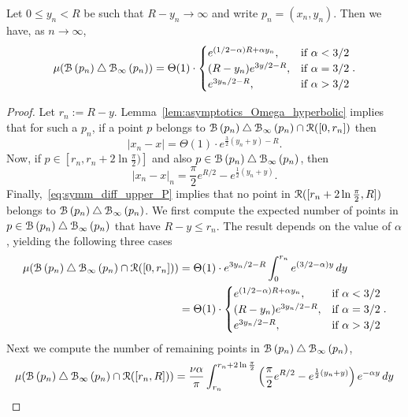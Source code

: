 \begin{lemma}\label{lem:sym_diff_measure_H_P}
Let $0 \le y_n <R$ be such that $R - y_n \to \infty$ and write $p_n = (x_n, y_n)$. Then we have, as $n \to \infty$,
\[
	\mu ({\mathcal B}\left(p_n\right) \bigtriangleup {\mathcal B}_{\infty}\left(p_n\right) ) 
	= \Theta (1) \cdot \begin{cases} 
		e^{(1/2-\alpha)R + \alpha y_n}, & \mbox{if } \alpha < 3/2 \\
		(R-y_n) e^{3y/2 - R}, & \mbox{if }\alpha = 3/2\\
		e^{3y_n/2 - R}, &  \mbox{if } \alpha > 3/2 
	\end{cases}.
\]
\end{lemma}

\begin{proof}
Let $r_n := R - y$. Lemma~\ref{lem:asymptotics_Omega_hyperbolic} implies that for such a $p_n$, if a point $p$ belongs to ${\mathcal B}\left(p_n\right) \bigtriangleup {\mathcal B}_{\infty}\left(p_n\right) \cap {\mathcal R} ([0,r_n])$ then 
\[
	|x_n - x| = \Theta(1) \cdot e^{\frac{3}{2} (y_n + y) - R}.
\]
Now, if $p \in [r_n, r_n + 2 \ln \frac{\pi}{2})]$ and also $p \in {\mathcal B}\left(p_n\right) \bigtriangleup {\mathcal B}_{\infty}\left(p_n\right)$, then 
\[
	|x_n-x|_n =\frac{\pi}{2} e^{R/2} - e^{\frac{1}{2} (y_n + y)}.
\]
Finally,~\eqref{eq:symm_diff_upper_P} implies that no point in ${\mathcal R} ([r_n+2\ln \frac{\pi}{2},R])$ belongs to ${\mathcal B}\left(p_n\right) \bigtriangleup {\mathcal B}_{\infty}\left(p_n\right)$. We first compute the expected number of points in $p \in {\mathcal B}\left(p_n\right) \bigtriangleup {\mathcal B}_{\infty}\left(p_n\right)$ that have $R - y \le r_n$. The result depends on the value of $\alpha$, yielding the following three cases
\begin{align*}
	\mu ({\mathcal B}\left(p_n\right) \bigtriangleup {\mathcal B}_{\infty}\left(p_n\right) \cap {\mathcal R} ([0,r_n])) 
	&= \Theta(1) \cdot e^{3y_n/2 - R}\int_0^{r_n} e^{(3/2-\alpha) y} \, dy \\
	&= \Theta(1)\cdot \begin{cases} e^{(1/2-\alpha)R + \alpha y_n}, & \mbox{if } \alpha < 3/2 \\
		(R - y_n) e^{3y_n/2 - R}, & \mbox{if }\alpha = 3/2\\
		e^{3y_n/2 - R}, &  \mbox{if } \alpha > 3/2
	\end{cases}.
\end{align*}
Next we compute the number of remaining points in ${\mathcal B}\left(p_n\right) \bigtriangleup {\mathcal B}_{\infty}\left(p_n\right)$, 
\begin{align*}
	\mu (\BallHyp{p_n} \bigtriangleup \BallPo{p_n} \cap \Rcal ([r_n, R])) 
	&= \frac{\nu\alpha}{\pi} \int_{r_n}^{r_n + 2 \ln \frac{\pi}{2}} 
		\left(\frac{\pi}{2} e^{R/2} - e^{\frac{1}{2} (y_n + y)}\right)e^{-\alpha y} \, dy \\

\end{align*}
\end{proof}

